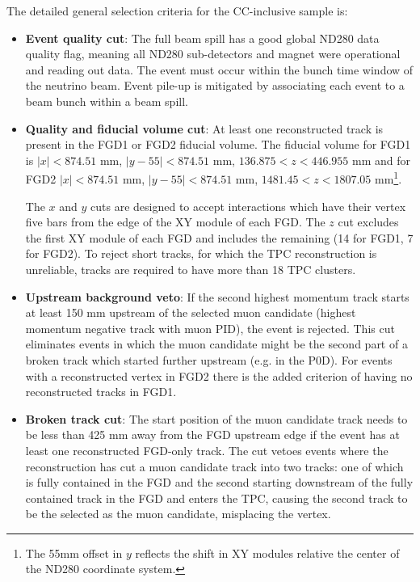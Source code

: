 The detailed general selection criteria for the CC-inclusive sample is:
\begin{itemize}
	\item \textbf{Event quality cut}: The full beam spill has a good global ND280 data quality flag, meaning all ND280 sub-detectors and magnet were operational and reading out data. The event must occur within the bunch time window of the neutrino beam. Event pile-up is mitigated by associating each event to a beam bunch within a beam spill.
	
	\item \textbf{Quality and fiducial volume cut}: At least one reconstructed track is present in the FGD1 or FGD2 fiducial volume. The fiducial volume for FGD1 is $|x|<874.51\text{ mm}$, $|y-55|<874.51\text{ mm}$, $136.875 < z < 446.955\text{ mm}$ and for FGD2 $|x|<874.51\text{ mm}$, $|y-55|<874.51\text{ mm}$, $1481.45< z < 1807.05\text{ mm}$\footnote{The 55mm offset in $y$ reflects the shift in XY modules relative the center of the ND280 coordinate system.}.
	
	The $x$ and $y$ cuts are designed to accept interactions which have their vertex five bars from the edge of the XY module of each FGD. The $z$ cut excludes the first XY module of each FGD and includes the remaining (14 for FGD1, 7 for FGD2). To reject short tracks, for which the TPC reconstruction is unreliable, tracks are required to have more than 18 TPC clusters.
	
	\item \textbf{Upstream background veto}: If the second highest momentum track starts at least 150 mm upstream of the selected muon candidate (highest momentum negative track with muon PID), the event is rejected. This cut eliminates events in which the muon candidate might be the second part of a broken track which started further upstream (e.g. in the P0D). For events with a reconstructed vertex in FGD2 there is the added criterion of having no reconstructed tracks in FGD1.
	
	\item \textbf{Broken track cut}: The start position of the muon candidate track needs to be less than 425 mm away from the FGD upstream edge if the event has at least one reconstructed FGD-only track. The cut vetoes events where the reconstruction has cut a muon candidate track into two tracks: one of which is fully contained in the FGD and the second starting downstream of the fully contained track in the FGD and enters the TPC, causing the second track to be the selected as the muon candidate, misplacing the vertex.
	

\end{itemize}
